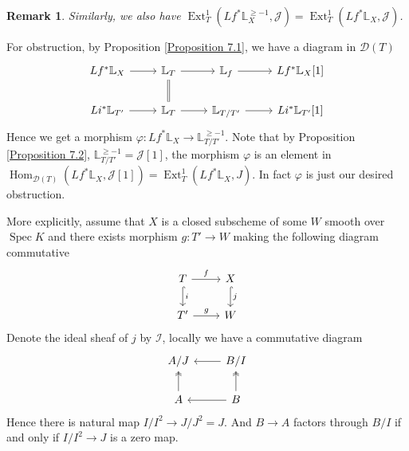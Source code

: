 \documentclass{ctexart}
\newtheorem{remark}{Remark}[section]
\renewcommand{\hom}{\operatorname{Hom}}
\newcommand{\ext}{\operatorname{Ext}}
\newcommand{\spec}{\operatorname{Spec}}
\begin{document}
\begin{remark}
    Similarly, we also have $\ext_{T}^{1}(Lf^{\ast}\mathbb{L}_{X}^{\ge -1}, \mathcal{J}) = \ext_{T}^{1}(Lf^{\ast}\mathbb{L}_{X}, \mathcal{J})$.
\end{remark}
For obstruction, by Proposition \ref{Proposition 7.1}, we have a diagram in $\mathcal{D}(T)$
\begin{equation}
    \begin{tikzcd}
        Lf^{\ast}\mathbb{L}_{X} \arrow[r] &
        \mathbb{L}_{T} \arrow[r] \arrow[d, equal] &
        \mathbb{L}_{f} \arrow[r] &
        Lf^{\ast}\mathbb{L}_{X}[1] \\
        Li^{\ast}\mathbb{L}_{T'} \arrow[r] &
        \mathbb{L}_{T} \arrow[r] &
        \mathbb{L}_{T/T'} \arrow[r] &
        Li^{\ast}\mathbb{L}_{T'}[1]
    \end{tikzcd}
\end{equation}
Hence we get a morphism $\varphi: Lf^{\ast}\mathbb{L}_{X} \rightarrow \mathbb{L}_{T/T'}^{\ge -1}$.
Note that by Proposition \ref{Proposition 7.2}, $\mathbb{L}_{T/T'}^{\ge -1} = \mathcal{J}[1]$, 
the morphism $\varphi$ is an element in $\hom_{\mathcal{D}(T)}(Lf^{\ast}\mathbb{L}_{X}, \mathcal{J}[1]) = \ext_{T}^{1}(Lf^{\ast}\mathbb{L}_{X}, J)$.
In fact $\varphi$ is just our desired obstruction.
\par
More explicitly, assume that $X$ is a closed subscheme of some $W$ smooth over $\spec K$ and there exists morphism $g: T' \rightarrow W$ making the following diagram commutative
\begin{equation}
    \begin{tikzcd}
        T \arrow[r, "f"] \arrow[d, hookrightarrow, "i"] &
        X \arrow[d, hookrightarrow, "j"] \\
        T' \arrow[r, "g"] &
        W
    \end{tikzcd}
\end{equation}
Denote the ideal sheaf of $j$ by $\mathcal{I}$, locally we have a commutative diagram
\begin{equation}
    \begin{tikzcd}
        A/J &
        B/I \arrow[l] \\
        A \arrow[u, twoheadrightarrow] &
        B \arrow[l] \arrow[u, twoheadrightarrow]
    \end{tikzcd}
\end{equation}
Hence there is natural map $I/I^{2} \rightarrow J/J^{2} = J$.
And $B \rightarrow A$ factors through $B/I$ if and only if $I/I^{2} \rightarrow J$ is a zero map.
\end{document}
